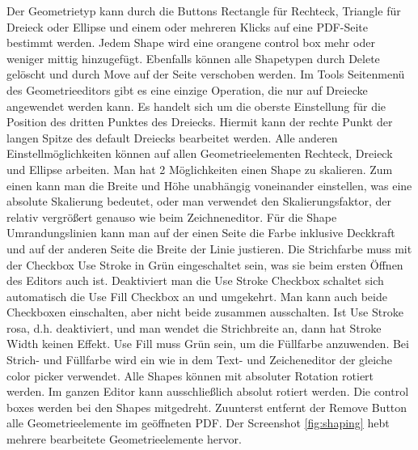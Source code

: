 Der Geometrietyp kann durch die Buttons Rectangle für Rechteck, Triangle für Dreieck oder Ellipse  und einem oder mehreren Klicks auf eine PDF-Seite bestimmt werden. Jedem Shape wird eine orangene control box mehr oder weniger mittig hinzugefügt. Ebenfalls können alle Shapetypen durch Delete gelöscht und durch Move auf der Seite verschoben werden. Im Tools Seitenmenü des Geometrieeditors gibt es eine einzige Operation, die nur auf Dreiecke angewendet werden kann. Es handelt sich um die oberste Einstellung für die Position des dritten Punktes des Dreiecks. Hiermit kann der rechte Punkt der langen Spitze des default Dreiecks bearbeitet werden. Alle anderen Einstellmöglichkeiten können auf allen Geometrieelementen Rechteck, Dreieck und Ellipse arbeiten. Man hat 2 Möglichkeiten einen Shape zu skalieren. Zum einen kann man die Breite und Höhe unabhängig voneinander einstellen, was eine absolute Skalierung bedeutet, oder man verwendet den Skalierungsfaktor, der relativ vergrößert genauso wie beim Zeichneneditor. Für die Shape Umrandungslinien kann man auf der einen Seite die Farbe inklusive Deckkraft und auf der anderen Seite die Breite der Linie justieren. Die Strichfarbe muss mit der Checkbox Use Stroke in Grün eingeschaltet sein, was sie beim ersten Öffnen des Editors auch ist. Deaktiviert man die Use Stroke Checkbox schaltet sich automatisch die Use Fill Checkbox an und umgekehrt. Man kann auch beide Checkboxen einschalten, aber nicht beide zusammen ausschalten. Ist Use Stroke rosa, d.h. deaktiviert, und man wendet die Strichbreite an, dann hat Stroke Width keinen Effekt. Use Fill muss Grün sein, um die Füllfarbe anzuwenden. Bei Strich- und Füllfarbe wird ein wie in dem Text- und Zeicheneditor der gleiche color picker verwendet. Alle Shapes können mit absoluter Rotation rotiert werden. Im ganzen Editor kann ausschließlich absolut rotiert werden. Die control boxes werden bei den Shapes mitgedreht. Zuunterst entfernt der Remove Button alle Geometrieelemente im geöffneten PDF. Der Screenshot \ref{fig:shaping} hebt mehrere bearbeitete Geometrieelemente hervor.

